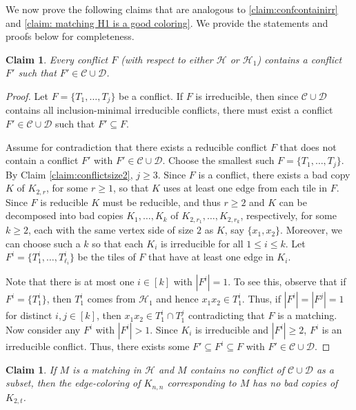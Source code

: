 \documentclass{article}
\newtheorem{claim}[theorem]{Claim}
\theoremstyle{definition}
\newcommand\cH{{\mathcal H}}
\newcommand\cC{{\mathcal C}}
\begin{document}
We now prove the following claims that are analogous to \cref{claim:confcontainirr} and \cref{claim: matching H1 is a good coloring}. We provide the statements and proofs below for completeness. 

\begin{claim}\label{claim: F contains conflict-system}
    Every conflict $F$ (with respect to either $\mathcal{H}$ or $\mathcal{H}_1$) contains a conflict $F'$ such that $F'\in \mathcal{C}\cup \mathcal{D}$.
\end{claim}

\begin{proof}
Let $F=\{T_1,\dots, T_j\}$ be a conflict.  
If $F$ is irreducible, then since $\mathcal{C}\cup \mathcal{D}$ contains all inclusion-minimal irreducible conflicts, there must exist a conflict $F'\in \mathcal{C}\cup \mathcal{D}$ such that $F'\subseteq F$. 

Assume for contradiction that there exists a reducible conflict $F$ that does not contain a conflict $F'$ with $F'\in \mathcal{C}\cup \mathcal{D}$. Choose the smallest such $F=\{T_1,\dots, T_j\}$. By Claim \ref{claim:conflictsize2}, $j\ge 3$. Since $F$ is a conflict, there exists a bad copy $K$ of $K_{2,r}$, for some $r\geq 1$, so that $K$ uses at least one edge from each tile in $F$. Since $F$ is reducible $K$ must be  reducible,  and thus  $r\ge 2$ and $K$ can be decomposed into bad copies $K_1,\dots,K_k$ of $K_{2,r_1},\dots,K_{2,r_k}$, respectively, for some $k\geq 2$, each with the same vertex side of size $2$ as $K$, say $\{x_1,x_2\}$. Moreover, we can choose such a $k$ so that each $K_i$ is irreducible for all $1\le i\le k$. Let $F^i=\{T_1^i,\dots,T_{\ell_i}^i\}$ be the tiles of $F$ that have at least one edge in $K_i$. 

Note that there is at most one $i\in [k]$ with $|F^i|=1$. To see this, observe that if $F^i=\{T^i_1\}$, then $T_1^i$ comes from $\mathcal{H}_1$ and hence $x_1x_2\in T^i_1$. Thus, if $|F^i|=|F^j|=1$ for distinct $i,j\in [k]$, then $x_1x_2\in T^i_1\cap T^j_1$ contradicting that $F$ is a matching. Now consider any $F^i$ with $|F^i|>1$. Since $K_i$ is irreducible and $|F^i|\geq 2$, $F^i$ is an irreducible conflict. Thus, there exists some $F'\subseteq F^i\subseteq F$ with $F'\in \mathcal{C}\cup \mathcal{D}$. 
\end{proof}

\begin{claim}\label{claim: matching is a good coloring}
If $M$ is a matching in $\cH$ and $M$ contains no conflict of $\cC \cup \mathcal{D}$ as a subset, then the edge-coloring of $K_{n,n}$ corresponding to $M$ has no bad copies of $K_{2,t}$. 
\end{claim}
\end{document}
